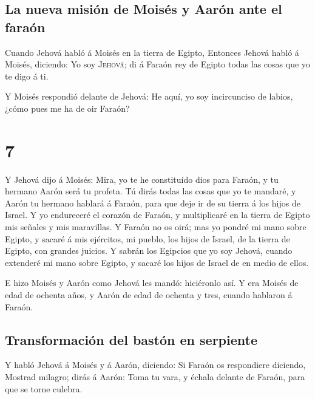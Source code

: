 \hypertarget{la-nueva-misiuxf3n-de-moisuxe9s-y-aaruxf3n-ante-el-farauxf3n}{%
\subsection{La nueva misión de Moisés y Aarón ante el
faraón}\label{la-nueva-misiuxf3n-de-moisuxe9s-y-aaruxf3n-ante-el-farauxf3n}}

 Cuando Jehová habló á Moisés en la tierra de Egipto,
 Entonces Jehová habló á Moisés, diciendo: Yo soy
\textsc{Jehová}; di á Faraón rey de Egipto todas las cosas que yo te
digo á ti.

 Y Moisés respondió delante de Jehová: He aquí, yo soy
incircunciso de labios, ¿cómo pues me ha de oir Faraón?

\hypertarget{section-02-7}{%
\section{7}\label{section-02-7}}

 Y Jehová dijo á Moisés: Mira, yo te he constituído dios
para Faraón, y tu hermano Aarón será tu profeta.  Tú dirás
todas las cosas que yo te mandaré, y Aarón tu hermano hablará á Faraón,
para que deje ir de su tierra á los hijos de Israel.  Y yo
endureceré el corazón de Faraón, y multiplicaré en la tierra de Egipto
mis señales y mis maravillas.  Y Faraón no os oirá; mas yo
pondré mi mano sobre Egipto, y sacaré á mis ejércitos, mi pueblo, los
hijos de Israel, de la tierra de Egipto, con grandes juicios.
 Y sabrán los Egipcios que yo soy Jehová, cuando extenderé
mi mano sobre Egipto, y sacaré los hijos de Israel de en medio de ellos.

 E hizo Moisés y Aarón como Jehová les mandó: hiciéronlo
así.  Y era Moisés de edad de ochenta años, y Aarón de
edad de ochenta y tres, cuando hablaron á Faraón.

\hypertarget{transformaciuxf3n-del-bastuxf3n-en-serpiente}{%
\subsection{Transformación del bastón en
serpiente}\label{transformaciuxf3n-del-bastuxf3n-en-serpiente}}

 Y habló Jehová á Moisés y á Aarón, diciendo:
 Si Faraón os respondiere diciendo, Mostrad milagro; dirás
á Aarón: Toma tu vara, y échala delante de Faraón, para que se torne
culebra.


